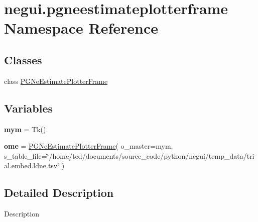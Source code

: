 \hypertarget{namespacenegui_1_1pgneestimateplotterframe}{}\section{negui.\+pgneestimateplotterframe Namespace Reference}
\label{namespacenegui_1_1pgneestimateplotterframe}
\subsection*{Classes}
\begin{DoxyCompactItemize}
\item 
class \hyperlink{classnegui_1_1pgneestimateplotterframe_1_1PGNeEstimatePlotterFrame}{P\+G\+Ne\+Estimate\+Plotter\+Frame}
\end{DoxyCompactItemize}
\subsection*{Variables}
\begin{DoxyCompactItemize}
\item 
{\bfseries mym} = Tk()\hypertarget{namespacenegui_1_1pgneestimateplotterframe_a72af4ff53fcafb0e3ddcac045d9670d7}{}\label{namespacenegui_1_1pgneestimateplotterframe_a72af4ff53fcafb0e3ddcac045d9670d7}

\item 
{\bfseries ome} = \hyperlink{classnegui_1_1pgneestimateplotterframe_1_1PGNeEstimatePlotterFrame}{P\+G\+Ne\+Estimate\+Plotter\+Frame}( o\+\_\+master=mym, s\+\_\+table\+\_\+file=\char`\"{}/home/ted/documents/source\+\_\+code/python/negui/temp\+\_\+data/trial.\+embed.\+ldne.\+tsv\char`\"{} )\hypertarget{namespacenegui_1_1pgneestimateplotterframe_ac0b9befd731af84c3d032902dc723573}{}\label{namespacenegui_1_1pgneestimateplotterframe_ac0b9befd731af84c3d032902dc723573}

\end{DoxyCompactItemize}


\subsection{Detailed Description}
\begin{DoxyVerb}Description
\end{DoxyVerb}
 
